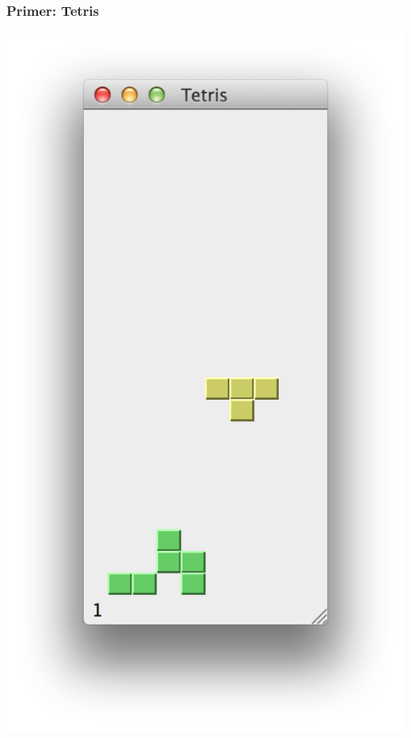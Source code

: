 \documentclass[utf8,compress,aspectratio=169]{beamer}
\begin{document}
\begin{frame}[fragile]
  \frametitle{Primer: Tetris}
\begin{center}
\includegraphics[scale=0.45]{pyqt18.png}
\end{center}
\end{frame}
\end{document}
